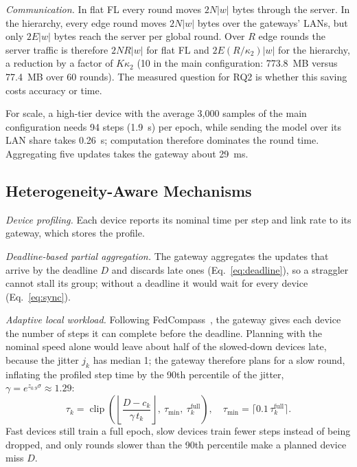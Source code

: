 \documentclass[conference]{IEEEtran}
\newcommand{\wsize}{|w|}
\begin{document}
\textit{Communication.} In flat FL every round moves $2N\wsize$ bytes through the server. In the hierarchy, every edge round moves $2N\wsize$ bytes over the gateways' LANs, but only $2E\wsize$ bytes reach the server per global round. Over $R$ edge rounds the server traffic is therefore $2NR\wsize$ for flat FL and $2E(R/\kappa_2)\wsize$ for the hierarchy, a reduction by a factor of $K\kappa_2$ (10 in the main configuration: 773.8~MB versus 77.4~MB over 60 rounds). The measured question for RQ2 is whether this saving costs accuracy or time.

For scale, a high-tier device with the average 3{,}000 samples of the main configuration needs 94 steps (1.9~s) per epoch, while sending the model over its LAN share takes 0.26~s; computation therefore dominates the round time. Aggregating five updates takes the gateway about 29~ms.

\subsection{Heterogeneity-Aware Mechanisms}
\textit{Device profiling.} Each device reports its nominal time per step and link rate to its gateway, which stores the profile.

\textit{Deadline-based partial aggregation.} The gateway aggregates the updates that arrive by the deadline $D$ and discards late ones (Eq.~\ref{eq:deadline}), so a straggler cannot stall its group; without a deadline it would wait for every device (Eq.~\ref{eq:sync}).

\textit{Adaptive local workload.} Following FedCompass~\cite{li2024fedcompass}, the gateway gives each device the number of steps it can complete before the deadline. Planning with the nominal speed alone would leave about half of the slowed-down devices late, because the jitter $j_k$ has median 1; the gateway therefore plans for a slow round, inflating the profiled step time by the 90th percentile of the jitter, $\gamma = e^{z_{0.9}\sigma} \approx 1.29$:
\begin{equation}
\tau_k = \operatorname{clip}\!\left( \left\lfloor \frac{D - c_k}{\gamma\, t_k} \right\rfloor,\ \tau_{\min},\ \tau_k^{\mathrm{full}} \right), \quad \tau_{\min} = \lceil 0.1\,\tau_k^{\mathrm{full}} \rceil .
\label{eq:adaptive}
\end{equation}
Fast devices still train a full epoch, slow devices train fewer steps instead of being dropped, and only rounds slower than the 90th percentile make a planned device miss $D$.
\end{document}
